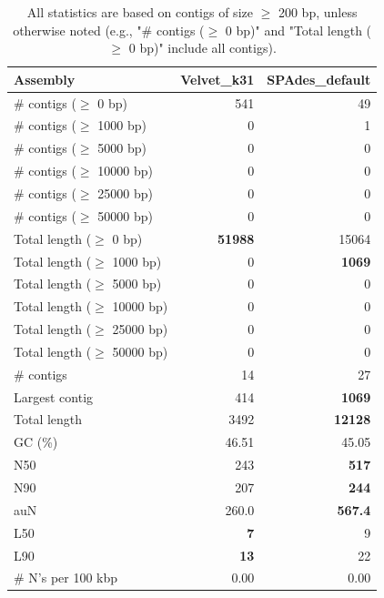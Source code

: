 \documentclass[12pt,a4paper]{article}
\begin{document}
\begin{table}[ht]
\begin{center}
\caption{All statistics are based on contigs of size $\geq$ 200 bp, unless otherwise noted (e.g., "\# contigs ($\geq$ 0 bp)" and "Total length ($\geq$ 0 bp)" include all contigs).}
\begin{tabular}{|l*{2}{|r}|}
\hline
Assembly & Velvet\_k31 & SPAdes\_default \\ \hline
\# contigs ($\geq$ 0 bp) & 541 & 49 \\ \hline
\# contigs ($\geq$ 1000 bp) & 0 & 1 \\ \hline
\# contigs ($\geq$ 5000 bp) & 0 & 0 \\ \hline
\# contigs ($\geq$ 10000 bp) & 0 & 0 \\ \hline
\# contigs ($\geq$ 25000 bp) & 0 & 0 \\ \hline
\# contigs ($\geq$ 50000 bp) & 0 & 0 \\ \hline
Total length ($\geq$ 0 bp) & {\bf 51988} & 15064 \\ \hline
Total length ($\geq$ 1000 bp) & 0 & {\bf 1069} \\ \hline
Total length ($\geq$ 5000 bp) & 0 & 0 \\ \hline
Total length ($\geq$ 10000 bp) & 0 & 0 \\ \hline
Total length ($\geq$ 25000 bp) & 0 & 0 \\ \hline
Total length ($\geq$ 50000 bp) & 0 & 0 \\ \hline
\# contigs & 14 & 27 \\ \hline
Largest contig & 414 & {\bf 1069} \\ \hline
Total length & 3492 & {\bf 12128} \\ \hline
GC (\%) & 46.51 & 45.05 \\ \hline
N50 & 243 & {\bf 517} \\ \hline
N90 & 207 & {\bf 244} \\ \hline
auN & 260.0 & {\bf 567.4} \\ \hline
L50 & {\bf 7} & 9 \\ \hline
L90 & {\bf 13} & 22 \\ \hline
\# N's per 100 kbp & 0.00 & 0.00 \\ \hline
\end{tabular}
\end{center}
\end{table}
\end{document}
